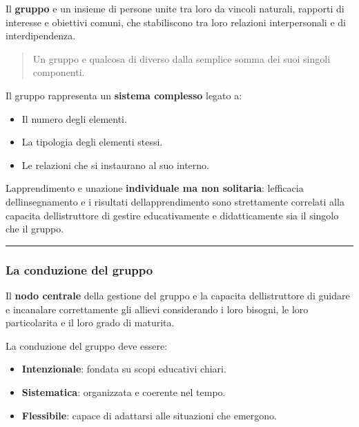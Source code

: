 \documentclass[a4paper,11pt]{article}
\providecommand{\tightlist}{%
  \setlength{\itemsep}{0pt}\setlength{\parskip}{0pt}}
\begin{document}
Il \textbf{gruppo} e un insieme di persone unite tra loro da vincoli
naturali, rapporti di interesse e obiettivi comuni, che stabiliscono tra
loro relazioni interpersonali e di interdipendenza.

\begin{quote}
      Un gruppo e qualcosa di diverso dalla semplice somma dei suoi singoli
      componenti.
\end{quote}

Il gruppo rappresenta un \textbf{sistema complesso} legato a:

\begin{itemize}
      \tightlist
      \item
            Il numero degli elementi.
      \item
            La tipologia degli elementi stessi.
      \item
            Le relazioni che si instaurano al suo interno.
\end{itemize}

L\textquotesingle apprendimento e un\textquotesingle azione
\textbf{individuale ma non solitaria}: l\textquotesingle efficacia
dell\textquotesingle insegnamento e i risultati
dell\textquotesingle apprendimento sono strettamente correlati alla
capacita dell\textquotesingle istruttore di gestire educativamente e
didatticamente sia il singolo che il gruppo.

\begin{center}\rule{0.5\linewidth}{0.5pt}\end{center}

\subsubsection{La conduzione del gruppo}\label{la-conduzione-del-gruppo}

Il \textbf{nodo centrale} della gestione del gruppo e la capacita
dell\textquotesingle istruttore di guidare e incanalare correttamente
gli allievi considerando i loro bisogni, le loro particolarita e il loro
grado di maturita.

La conduzione del gruppo deve essere:

\begin{itemize}
      \tightlist
      \item
            \textbf{Intenzionale}: fondata su scopi educativi chiari.
      \item
            \textbf{Sistematica}: organizzata e coerente nel tempo.
      \item
            \textbf{Flessibile}: capace di adattarsi alle situazioni che emergono.
\end{itemize}
\end{document}
